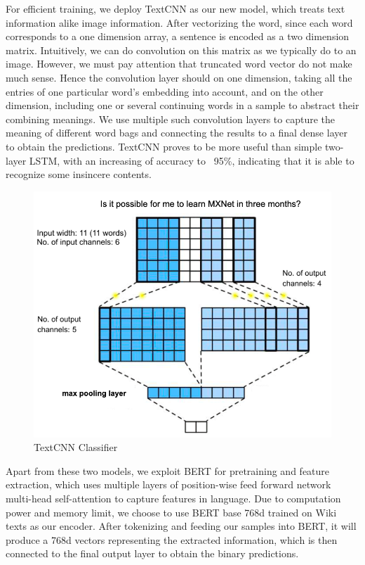 \documentclass{article}
\begin{document}
For efficient training, we deploy TextCNN as our new model, which treats text information alike image information. After vectorizing the word, since each word corresponds to a one dimension array, a sentence is encoded as a two dimension matrix. Intuitively, we can do convolution on this matrix as we typically do to an image. However, we must pay attention that truncated word vector do not make much sense. Hence the convolution layer should on one dimension, taking all the entries of one particular word's embedding into account, and on the other dimension, including one or several continuing words in a sample to abstract their combining meanings. We use multiple such convolution layers to capture the meaning of different word bags and connecting the results to a final dense layer to obtain the predictions. TextCNN proves to be more useful than simple two-layer LSTM, with an increasing of accuracy to ~95\%, indicating that it is able to recognize some insincere contents. 

\begin{figure}[h!]
	\centering
	\includegraphics[scale=0.4]{flow.png}
	\caption{TextCNN Classifier}
	\label{fig:flow}
\end{figure}

Apart from these two models, we exploit BERT for pretraining and feature extraction, which uses multiple layers of position-wise feed forward network multi-head self-attention to capture features in language. Due to computation power and memory limit, we choose to use BERT base 768d trained on Wiki texts as our encoder. After tokenizing and feeding our samples into BERT, it will produce a 768d vectors representing the extracted information, which is then connected to the final output layer to obtain the binary predictions.
\end{document}
